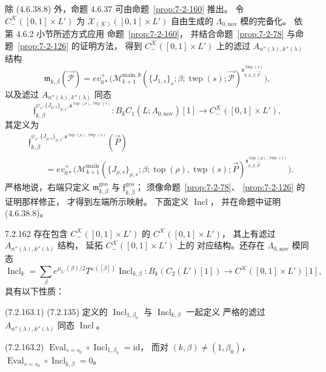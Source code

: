 除 (4.6.38.8) 外，命题 4.6.37
可由命题~\ref{prop:7-2-160} 推出。
令 $C^{\mathcal K}_-([0,1]\times L')$
为 $\mathcal X_{(\mathcal K)}([0,1]\times L')$
自由生成的 $\Lambda_{0,\mathrm{nov}}$ 模的完备化。
依第 4.6.2 小节所述方式应用
命题~\ref{prop:7-2-160}，
并结合命题~\ref{prop:7-2-78}
与命题~\ref{prop:7-2-126} 的证明方法，
得到 $C^{\mathcal K}_-([0,1]\times L')$
上的滤过 $A_{n''(\lambda),k''(\lambda)}$ 结构
\[
\mathfrak m_{k,\beta}(\vec{\mathcal P})
=ev_{0*}^+\bigl(
\mathcal M_{k+1}^{\mathrm{main},\mathfrak d}
(\{J_{1,s}\}_s;\beta;
\operatorname{twp}(s);\vec{\mathcal P})^{
\mathfrak s_{\mathfrak d,k,\beta,
\vec{\mathcal P}}^{\operatorname{twp}(s)}}\bigr),
\]
以及滤过 $A_{n''(\lambda),k''(\lambda)}$ 同态
\[
\mathfrak f^{\psi_s,\{J_{\rho,s}\}_{\rho,s},
\mathfrak s^{\operatorname{top}(\rho),\operatorname{twp}(s)}}_{k,\beta}
\colon B_kC_1(L;\Lambda_{0,\mathrm{nov}})[1]
\longrightarrow C^{\mathcal K}_-([0,1]\times L'),
\]
其定义为
\[
\begin{aligned}
&\mathfrak f^{\psi_s,\{J_{\rho,s}\}_{\rho,s},
\mathfrak s^{\operatorname{top}(\rho),\operatorname{twp}(s)}}_{k,\beta}
(\vec P)\\
&\qquad=ev_{0*}^+\bigl(
\mathcal M_{k+1}^{\mathrm{main}}
(\{J_{\rho,s}\}_{\rho,s};\beta;
\operatorname{top}(\rho),\operatorname{twp}(s);\vec P)^{
\mathfrak s_{k,\beta,\vec P}^{
\operatorname{top}(\rho),\operatorname{twp}(s)}}\bigr).
\end{aligned}
\]
严格地说，右端只定义
$\mathfrak m^{\mathrm{geo}}_{k,\beta}$
与 $\mathfrak f^{\mathrm{geo}}_{k,\beta}$；
须像命题~\ref{prop:7-2-78}、
\ref{prop:7-2-126} 的证明那样修正，
才得到左端所示映射。
下面定义 $\operatorname{Incl}$，
并在命题中证明 (4.6.38.8)。

\begin{proposition}{7.2.162}\label{prop:7-2-162}
%
存在包含 $C_-^{\mathcal K}([0,1]\times L')$ 的
$C^{\mathcal K}([0,1]\times L')$，
其上有滤过 $A_{n''(\lambda),k''(\lambda)}$ 结构，
延拓 $C_-^{\mathcal K}([0,1]\times L')$ 上的
对应结构。还存在 $\Lambda_{0,\mathrm{nov}}$
模同态
\[
\operatorname{Incl}_k
=\sum_\beta e^{\mu_{L'}(\beta)/2}
T^{\omega([\beta])}\operatorname{Incl}_{k,\beta}
\colon B_k(C_2(L')[1])
\longrightarrow C^{\mathcal K}([0,1]\times L')[1],
\]
具有以下性质：

\noindent\textup{(7.2.163.1)}\quad
(7.2.135) 定义的
$\operatorname{Incl}_{1,\beta_0}$
与 $\operatorname{Incl}_{k,\beta}$ 一起定义
严格的滤过 $A_{n''(\lambda),k''(\lambda)}$
同态 $\operatorname{Incl}$。

\noindent\textup{(7.2.163.2)}\quad
$\operatorname{Eval}_{s=s_0}\circ
\operatorname{Incl}_{1,\beta_0}=\mathrm{id}$，
而对 $(k,\beta)\ne(1,\beta_0)$，
$\operatorname{Eval}_{s=s_0}\circ
\operatorname{Incl}_{k,\beta}=0$。
\end{proposition}


